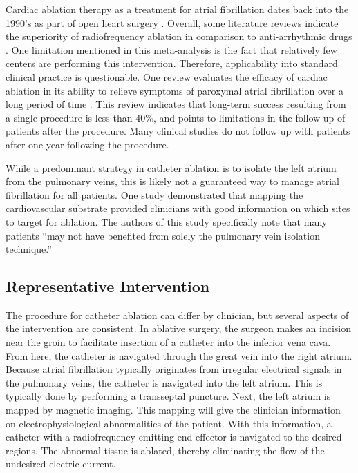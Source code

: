 \documentclass[letterpaper,10pt,conference]{ieeeconf}   %
\begin{document}
Cardiac ablation therapy as a treatment for atrial fibrillation dates back into the 1990's as part of open heart surgery \cite{cox:91a}. Overall, some literature reviews indicate the superiority of radiofrequency ablation in comparison to anti-arrhythmic drugs \cite{cappato:05a,calkins:09a}. One limitation mentioned in this meta-analysis is the fact that relatively few centers are performing this intervention. Therefore, applicability into standard clinical practice is questionable. One review evaluates the efficacy of cardiac ablation in its ability to relieve symptoms of paroxymal atrial fibrillation over a long period of time \cite{cheema2006long}. This review indicates that long-term success resulting from a single procedure is less than $40\%$, and points to limitations in the follow-up of patients after the procedure. Many clinical studies do not follow up with patients after one year following the procedure.  

While a predominant strategy in catheter ablation is to isolate the left atrium from the pulmonary veins, this is likely not a guaranteed way to manage atrial fibrillation for all patients. One study \cite{nademanee:04a} demonstrated that mapping the cardiovascular substrate provided clinicians with good information on which sites to target for ablation. The authors of this study specifically note that many patients ``may not have benefited from solely the pulmonary vein isolation technique.'' 

\subsection{Representative Intervention}
\label{sec:repintervention}

The procedure for catheter ablation can differ by clinician, but several aspects of the intervention are consistent. In ablative surgery, the surgeon makes an incision near the groin to facilitate insertion of a catheter into the inferior vena cava. From here, the catheter is navigated through the great vein into the right atrium. Because atrial fibrillation typically originates from irregular electrical signals in the pulmonary veins, the catheter is navigated into the left atrium. This is typically done by performing a transseptal puncture. Next, the left atrium is mapped by magnetic imaging. This mapping will give the clinician information on electrophysiological abnormalities of the patient. With this information, a catheter with a radiofrequency-emitting end effector is navigated to the desired regions. The abnormal tissue is ablated, thereby eliminating the flow of the undesired electric current. 
\end{document}
